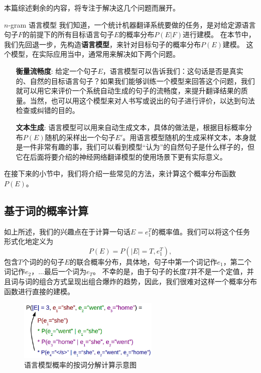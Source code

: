 \documentclass[10pt,a4paper]{ctexart}
\makeatletter
\renewcommand{\section}{\@startsection{section}{1}{0mm}
  {-\baselineskip}{0.5\baselineskip}{\bf\leftline}}
\makeatother
\begin{document}
本篇综述剩余的内容，将专注于解决这几个问题而展开。

\section{$n$-gram 语言模型}
我们知道，一个统计机器翻译系统要做的任务，是对给定源语言句子$F$的前提下的所有目标语言句子$E$的概率分布$P(E | F)$进行建模。
在本节中，我们先回退一步，先构造\textbf{语言模型}，来针对目标句子的概率分布$P(E)$建模。
这个模型，在实际应用当中，通常用来解决如下两个问题。
\begin{enumerate}
\item[\textbf{衡量流畅度}:] 给定一个句子$E$，语言模型可以告诉我们：这句话是否是真实的、自然的目标语言句子？如果我们能够训练一个模型来回答这个问题，我们就可以用它来评价一个系统自动生成的句子的流畅度，来提升翻译结果的质量。当然，也可以用这个模型来对人书写或说出的句子进行评价，以达到句法检查或纠错的目的。
\item[\textbf{文本生成}:] 语言模型可以用来自动生成文本，具体的做法是，根据目标概率分布$P(E)$随机的采样出一个句子$E'$。用语言模型随机的生成采样文本，本身就是一件非常有趣的事，我们可以看到模型“认为”的自然句子是什么样子的，但它在后面将要介绍的神经网络翻译模型的使用场景下更有实际意义。
\end{enumerate}
在接下来的小节中，我们将介绍一些常见的方法，来计算这个概率分布函数$P(E)$。

\subsection{基于词的概率计算}
如上所述，我们的兴趣点在于计算一句话$E=e_1^T$的概率值。我们可以将这个任务形式化地定义为
\[
  P(E) = P(|E| = T,e_1^T),
\]
包含$T$个词的的句子$E$的联合概率分布，具体地，句子中第一个词记作$e_1$，第二个词记作$e_2$，...最后一个词为$e_T$。
不幸的是，由于句子的长度$T$并不是一个定值，并且词与词的组合方式呈现出组合爆炸的趋势，因此，我们很难对这样一个概率分布函数进行直接的建模。

\begin{figure}[H]
\centering
\includegraphics[width=0.6\textwidth]{fig2.png}
\caption{语言模型概率的按词分解计算示意图}
\label{fig:2}
\end{figure}
\end{document}
